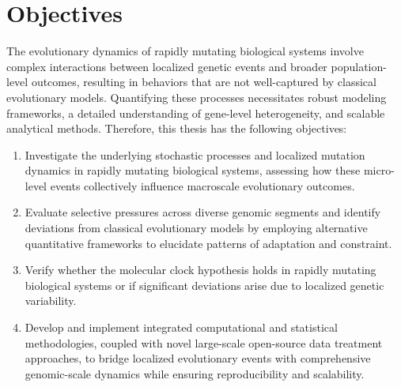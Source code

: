 \chapter{Objectives}
\thispagestyle{myobjectives}

The evolutionary dynamics of rapidly mutating biological systems involve complex interactions between localized genetic events and broader population-level outcomes, resulting in behaviors that are not well-captured by classical evolutionary models. Quantifying these processes necessitates robust modeling frameworks, a detailed understanding of gene-level heterogeneity, and scalable analytical methods. Therefore, this thesis has the following objectives:

\begin{enumerate}
    \item Investigate the underlying stochastic processes and localized mutation dynamics in rapidly mutating biological systems, assessing how these micro-level events collectively influence macroscale evolutionary outcomes.
    \item Evaluate selective pressures across diverse genomic segments and identify deviations from classical evolutionary models by employing alternative quantitative frameworks to elucidate patterns of adaptation and constraint.
    \item Verify whether the molecular clock hypothesis holds in rapidly mutating biological systems or if significant deviations arise due to localized genetic variability.
    \item Develop and implement integrated computational and statistical methodologies, coupled with novel large-scale open-source data treatment approaches, to bridge localized evolutionary events with comprehensive genomic-scale dynamics while ensuring reproducibility and scalability.
\end{enumerate}

\pagestyle{plain}